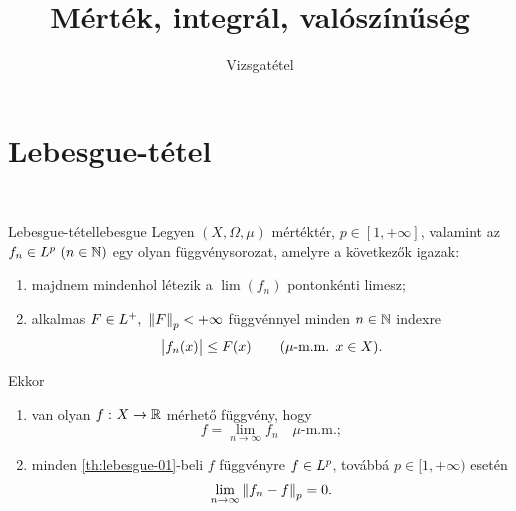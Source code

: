 \documentclass[
]{elteikthesis}[2024/04/26]
\title{Mérték, integrál, valószínűség} %
\subtitle{\circled{18} Vizsgatétel}
\begin{document}
	
	
	\section{Lebesgue-tétel}
	
	\,
	
	\begin{theorem}{Lebesgue-tétel}{lebesgue}
		Legyen \( (X, \Omega, \mu) \) mértéktér, \( p \in [1, +\infty] \), 
		valamint az \( f_n \in \Lebesgue[p] \ (n \in \N) \) egy olyan függvénysorozat, 
		amelyre a következők igazak:
		\begin{enumerate}[label=\roman*)]
			\item\label{eq:lebesgue-01}
			majdnem mindenhol létezik a \( \lim(f_n) \) pontonkénti limesz;
			
			\item\label{eq:lebesgue-02}
			alkalmas \( F \in L^+, \ \norm{F}_p < +\infty \) függvénnyel
			minden \( n \in \mathbb{N} \) indexre
			\[
				\abs\big{f_n(x)} \leq F(x) \qquad (\mu \text{-m.m. } x \in X).
			\]
		\end{enumerate}
		Ekkor
		\begin{enumerate}[label=\alph*)]
			\item\label{th:lebesgue-01}
			van olyan \( f \,\colon X \to \mathbb{R} \) mérhető függvény, hogy
			\[
				f = \lim_{n \to \infty} f_n \quad \mu \text{-m.m.};
			\]
			
			\item\label{th:lebesgue-02}
			minden \ref{th:lebesgue-01}-beli \( f \) függvényre \( f \in \Lebesgue[p] \), 
			továbbá \( p \in [1, +\infty) \) esetén
			\[
				\lim\limits_{n \to \infty} \norm{f_n - f}_p = 0.
			\]
		\end{enumerate}
	\end{theorem}
\end{document}
